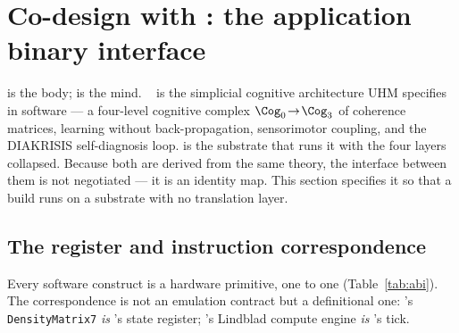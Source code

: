 \section{Co-design with \SYNARC{}: the application binary interface}
\label{sec:abi}

\TALOS{} is the body; \SYNARC{} is the mind. \SYNARC{}~\cite{synarc2026} is the
simplicial cognitive architecture UHM specifies in software --- a four-level cognitive
complex $\Cog_0\!\to\!\Cog_3$ of coherence matrices, learning without
back-propagation, sensorimotor coupling, and the DIAKRISIS self-diagnosis
loop. \TALOS{} is the substrate that runs it with the four layers collapsed.
Because both are derived from the same theory, the interface between them is
not negotiated --- it is an identity map. This section specifies it so that a
\SYNARC{} build runs on a \TALOS{} substrate with no translation layer.

\subsection{The register and instruction correspondence}

Every \SYNARC{} software construct is a \TALOS{} hardware primitive, one to
one (Table~\ref{tab:abi}). The correspondence is not an emulation contract
but a definitional one: \SYNARC{}'s \texttt{DensityMatrix7} \emph{is}
\TALOS{}'s state register; \SYNARC{}'s Lindblad compute engine \emph{is}
\TALOS{}'s tick.

